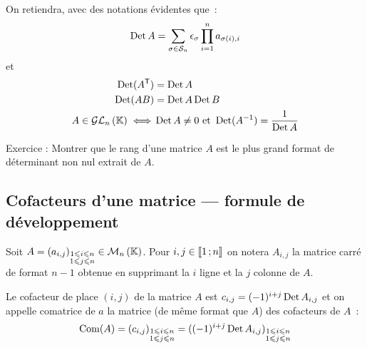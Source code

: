 On retiendra, avec des notations évidentes que~:
\begin{equation}
	\operatorname{Det} A = \sum_{\sigma \in \mathcal{S}_n} \epsilon_\sigma \prod_{i=1}^{n} a_{\sigma(i),i}
\end{equation}
et
\begin{align}
	\operatorname{Det}(A^{\mathsf{T}}) &= \operatorname{Det} A \\
	\operatorname{Det}(AB) &= \operatorname{Det} A \operatorname{Det} B\\
	A \in \mathcal{GL}_{n}\left(\mathbb{K}\right) \iff& \operatorname{Det} A \neq 0 \ \text{et} \ \operatorname{Det}(A^{-1}) = \frac{1}{\operatorname{Det} A} 
\end{align}

Exercice : Montrer que le rang d'une matrice $A$ est le plus grand format de déterminant non nul extrait de $A$.

\subsection{Cofacteurs d'une matrice --- formule de développement}
\begin{defdef}[Cofacteurs]
	Soit $A = (a_{i,j})_{\substack{1\leqslant i \leqslant n \\ 1 \leqslant j \leqslant n}} \in \mathcal{M}_{n}\left(\mathbb{K}\right)$. Pour $i, j \in \mathopen{\llbracket}1\mathclose{}\mathpunct{};n\mathclose{\rrbracket}$ on notera $A_{i,j}$ la matrice carré de format $n-1$ obtenue en supprimant la $i$\ieme{} ligne et la $j$\ieme{} colonne de $A$.
	
	Le cofacteur de place $(i,j)$ de la matrice $A$ est $c_{i,j} = (-1)^{i+j} \operatorname{Det} A_{i,j}$ et on appelle comatrice de $a$ la matrice (de même format que $A$) des cofacteurs de $A$~:
	\begin{equation}
		\operatorname{Com}(A) = (c_{i,j})_{\substack{1\leqslant i \leqslant n \\ 1 \leqslant j \leqslant n}} = ((-1)^{i+j} \operatorname{Det} A_{i,j})_{\substack{1\leqslant i \leqslant n \\ 1 \leqslant j \leqslant n}}
	\end{equation}
\end{defdef}

